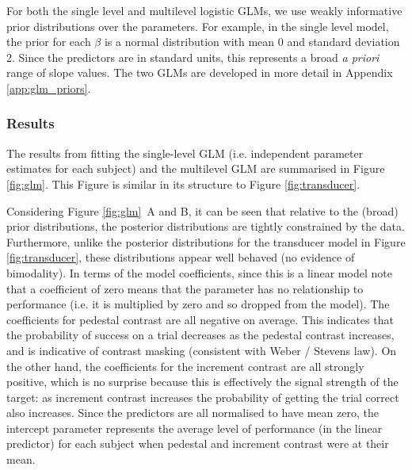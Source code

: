 \documentclass[11pt,a4paper]{article}
\begin{document}
For both the single level and multilevel logistic GLMs, we use weakly informative prior distributions over the parameters.
For example, in the single level model, the prior for each $\beta$ is a normal distribution with mean 0 and standard deviation 2.
Since the predictors are in standard units, this represents a broad \textit{a priori} range of slope values.
The two GLMs are developed in more detail in Appendix \ref{app:glm_priors}.

\subsubsection{Results}

The results from fitting the single-level GLM (i.e. independent parameter estimates for each subject) and the multilevel GLM are summarised in Figure \ref{fig:glm}.
This Figure is similar in its structure to Figure \ref{fig:transducer}.

Considering Figure \ref{fig:glm}~A and B, it can be seen that relative to the (broad) prior distributions, the posterior distributions are tightly constrained by the data.
Furthermore, unlike the posterior distributions for the transducer model in Figure \ref{fig:transducer}, these distributions appear well behaved (no evidence of bimodality).
In terms of the model coefficients, since this is a linear model note that a coefficient of zero means that the parameter has no relationship to performance (i.e. it is multiplied by zero and so dropped from the model).
The coefficients for pedestal contrast are all negative on average.
This indicates that the probability of success on a trial decreases as the pedestal contrast increases, and is indicative of contrast masking (consistent with Weber / Stevens law).
On the other hand, the coefficients for the increment contrast are all strongly positive, which is no surprise because this is effectively the signal strength of the target: as increment contrast increases the probability of getting the trial correct also increases.
Since the predictors are all normalised to have mean zero, the intercept parameter represents the average level of performance (in the linear predictor) for each subject when pedestal and increment contrast were at their mean.
\end{document}
